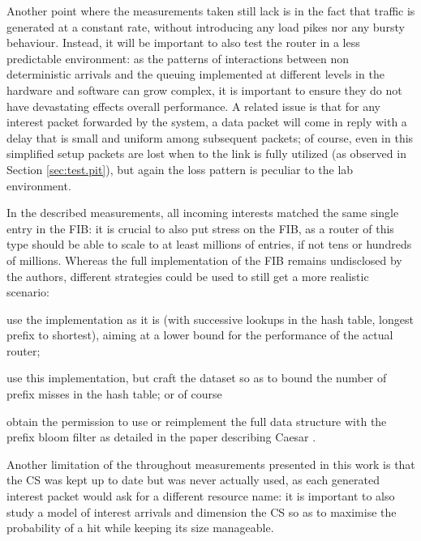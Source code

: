 \documentclass[11pt,a4paper,twoside,titlepage,openany]{book}
\begin{document}
Another point where the measurements taken still lack is in the fact that traffic is generated at a constant rate, without introducing any load pikes nor any bursty behaviour. Instead, it will be important to also test the router in a less predictable environment: as the patterns of interactions between non deterministic arrivals and the queuing implemented at different levels in the hardware and software can grow complex, it is important to ensure they do not have devastating effects overall performance.
A related issue is that for any interest packet forwarded by the system, a data packet will come in reply with a delay that is small and uniform among subsequent packets; of course, even in this simplified setup packets are lost when to the link is fully utilized (as observed in Section \ref{sec:test.pit}), but again the loss pattern is peculiar to the lab environment.

In the described measurements, all incoming interests matched the same single entry in the FIB: it is crucial to also put stress on the FIB, as a router of this type should be able to scale to at least millions of entries, if not tens or hundreds of millions. Whereas the full implementation of the FIB remains undisclosed by the authors, different strategies could be used to still get a more realistic scenario: 
\begin{inlineenum}\item use the implementation as it is (with successive lookups in the hash table, longest prefix to shortest), aiming at a lower bound for the performance of the actual router; \item use this implementation, but craft the dataset so as to bound the number of prefix misses in the hash table; or of course \item obtain the permission to use or reimplement the full data structure with the prefix bloom filter as detailed in the paper describing Caesar \cite{caesar}.\end{inlineenum}

Another limitation of the throughout measurements presented in this work is that the \gls{CS} was kept up to date but was never actually used, as each generated interest packet would ask for a different resource name: it is important to also study a model of interest arrivals and dimension the CS so as to maximise the probability of a hit while keeping its size manageable.


\end{document}
